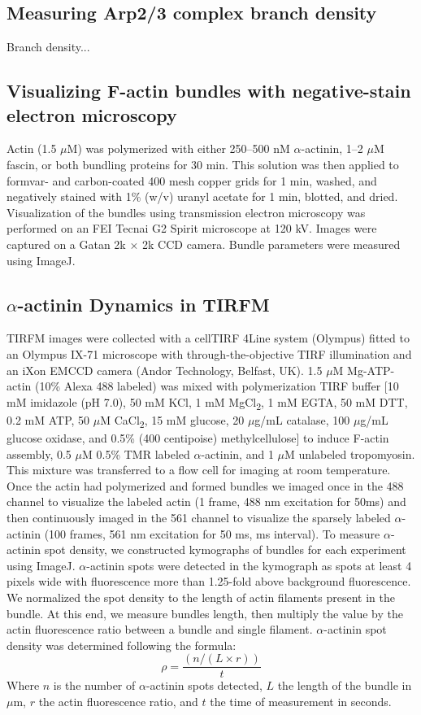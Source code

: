 \subsection{Measuring Arp2/3 complex branch density}
Branch density...

\subsection{Visualizing F-actin bundles with negative-stain electron microscopy}
Actin (1.5 $\mu$M) was polymerized with either 250–500 nM $\alpha$-actinin, 1–2 $\mu$M fascin, or both bundling proteins for 30 min. This solution was then applied to formvar- and carbon-coated 400 mesh copper grids for 1 min, washed, and negatively stained with 1\% (w/v) uranyl acetate for 1 min, blotted, and dried. Visualization of the bundles using transmission electron microscopy was performed on an FEI Tecnai G2 Spirit microscope at 120 kV. Images were captured on a Gatan 2k $\times$ 2k CCD camera. Bundle parameters were measured using ImageJ.

\subsection{\texorpdfstring{$\alpha$}{a}-actinin Dynamics in TIRFM}
TIRFM images were collected with a cellTIRF 4Line system (Olympus) fitted to an Olympus IX-71 microscope with through-the-objective TIRF illumination and an iXon EMCCD camera (Andor Technology, Belfast, UK). 1.5 $\mu$M Mg-ATP-actin (10\% Alexa 488 labeled) was mixed with polymerization TIRF buffer [10 mM imidazole (pH 7.0), 50 mM KCl, 1 mM MgCl\textsubscript{2}, 1 mM EGTA, 50 mM DTT, 0.2 mM ATP, 50 $\mu$M CaCl\textsubscript{2}, 15 mM glucose, 20 $\mu$g/mL catalase, 100 $\mu$g/mL glucose oxidase, and 0.5\% (400 centipoise) methylcellulose] to induce F-actin assembly, 0.5 $\mu$M 0.5\% TMR labeled $\alpha$-actinin, and 1 $\mu$M unlabeled tropomyosin. This mixture was transferred to a flow cell for imaging at room temperature. Once the actin had polymerized and formed bundles we imaged once in the 488 channel to visualize the labeled actin (1 frame, 488 nm excitation for 50ms) and then continuously imaged in the 561 channel to visualize the sparsely labeled $\alpha$-actinin (100 frames, 561 nm excitation for 50 ms,  ms interval).
To measure $\alpha$-actinin spot density, we constructed kymographs of bundles for each experiment using ImageJ. $\alpha$-actinin spots were detected in the kymograph as spots at least 4 pixels wide with fluorescence more than 1.25-fold above background fluorescence. We normalized the spot density to the length of actin filaments present in the bundle. At this end, we measure bundles length, then multiply the value by the actin fluorescence ratio between a bundle and single filament. $\alpha$-actinin spot density was determined following the formula: 
\[\rho = \frac{(n/(L\times r))}{t}\]
Where $n$ is the number of $\alpha$-actinin spots detected, $L$ the length of the bundle in $\mu$m, $r$ the actin fluorescence ratio, and $t$ the time of measurement in seconds.


